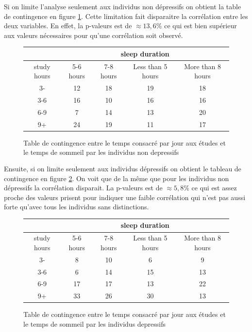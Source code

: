 Si on limite l'analyse seulement aux individus non dépressifs on obtient la table de contingence en figure \ref{tab:contTableStudySleepNonDepressive}.
Cette limitation fait disparaitre la corrélation entre les deux variables. 
En effet, la p-valeurs est de $\approx13,6\%$ ce qui est bien supérieur aux valeurs nécessaires pour qu'une corrélation soit observé.
   
\begin{figure}[!h]
    \begin{center}
        \begin{tabular}{|c|c|c|c|c|}
        \hline 
        & \multicolumn{4}{|c|}{sleep duration}\\ 
        \hline
        study hours & 5-6 hours & 7-8 hours & Less than 5 hours & More than 8 hours\\ 
        \hline 
        3- & 12 & 18 & 19 & 18\\ 
        \hline 
        3-6 & 16 & 10 & 16 & 16\\ 
        \hline 
        6-9 & 7 & 14 & 13 & 20\\ 
        \hline 
        9+ & 24 & 19 & 11 & 17 \\ 
        \hline
        \end{tabular}
    \end{center}
    \caption{Table de contingence entre le temps consacré par jour aux études et le temps de sommeil par les individus non depressifs}
    \label{tab:contTableStudySleepNonDepressive}
\end{figure}

Ensuite, si on limite seulement aux individus dépressifs on obtient le tableau de contingence en figure \ref{tab:contTableStudySleepDepressive}.
On voit que de la même que pour les individus non dépressifs la corrélation disparait.
La p-valeurs est de $\approx5,8\%$ ce qui est assez proche des valeurs prisent pour indiquer une faible corrélation qui n'est pas aussi forte qu'avec tous les individus sans distinctions. 

\begin{figure}[!h]
    \begin{center}
    \begin{tabular}{|c|c|c|c|c|}
        \hline 
        & \multicolumn{4}{|c|}{sleep duration}\\ 
        \hline
        study hours & 5-6 hours & 7-8 hours & Less than 5 hours & More than 8 hours\\ 
        \hline 
        3- & 8 & 10 & 6 & 9\\ 
        \hline 
        3-6 & 6 & 14 & 15 & 13\\ 
        \hline 
        6-9 & 17 & 17 & 13 & 22\\ 
        \hline 
        9+ & 33 & 26 & 30 & 13 \\ 
        \hline
    \end{tabular}
    \end{center}
    \caption{Table de contingence entre le temps consacré par jour aux études et le temps de sommeil par les individus depressifs}
    \label{tab:contTableStudySleepDepressive}
\end{figure}

